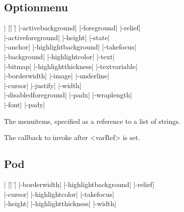 \subsection*{Optionmenu}
\vspace{-4pt}

\begin{tabbing}
|                    |\=|                    |\= \kill
|-activebackground| \> |-foreground|         \> |-relief| \\
|-activeforeground| \> |-height|             \> |-state| \\
|-anchor|           \> |-highlightbackground|\> |-takefocus| \\
|-background|       \> |-highlightcolor|     \> |-text| \\
|-bitmap|           \> |-highlightthickness| \> |-textvariable| \\
|-borderwidth|      \> |-image|              \> |-underline| \\
|-cursor|           \> |-justify|            \> |-width| \\
|-disabledforeground| \> |-padx| 	     \> |-wraplength| \\
|-font| 	    \> |-pady| \\
\end{tabbing}

\vskip5pt
\begin{enum}{1cm}

 The menuitems, specified as a
reference to a list of strings.

 The callback to invoke after <varRef> is set.
 
\end{enum}

\subsection*{Pod}
\vspace{-4pt}

\begin{tabbing}
|                   |\=|                     |\= \kill
|-borderwidth| \> |-highlightbackground|     \> |-relief| \\   
|-cursor|      \> |-highlightcolor|          \> |-takefocus| \\
|-height|      \> |-highlightthickness|      \> |-width| \\
\end{tabbing}

